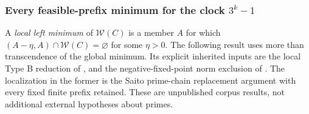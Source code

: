 \documentclass[11pt,a4paper]{article}
\theoremstyle{definition}\newtheorem{definition}[theorem]{Definition}
\theoremstyle{remark}\newtheorem{remark}[theorem]{Remark}
\begin{document}
\subsubsection{Every feasible-prefix minimum for the clock $3^k-1$}

A \emph{local left minimum} of $\mathcal W(C)$ is a member $A$ for
which $(A-\eta,A)\cap\mathcal W(C)=\varnothing$ for some $\eta>0$.
The following result uses more than transcendence of the global minimum.
Its explicit inherited inputs are the local Type B reduction of
\cite[section ``Local Type B and factorial perturbations'']{K031},
and the negative-fixed-point norm exclusion of \cite{K064}.
The localization in the former is the Saito prime-chain replacement
argument with every fixed finite prefix retained. These are unpublished
corpus results, not additional external hypotheses about primes.
\end{document}
